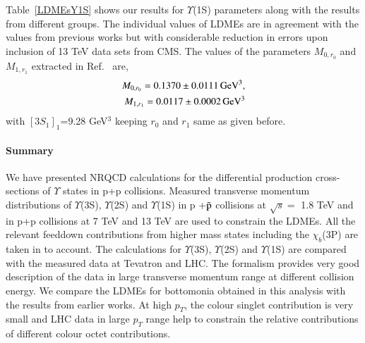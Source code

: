 Table~\ref{LDMEsY1S} shows our results for $\Upsilon$(1S) parameters along with
the results from different groups. The individual values of LDMEs are in agreement with
the values from previous works but with considerable reduction in 
errors upon inclusion of 13 TeV data sets from CMS.
The values of the parameters $M_{0,r_0}$ and $M_{1,r_1}$ extracted in Ref.~\cite{Han:2014kxa} are,
\begin{eqnarray}
  \nonumber
  M_{0,r_0}=0.1370\pm0.0111 \, {\rm GeV^3},\\ \nonumber
  M_{1,r_1}=0.0117\pm0.0002 \, {\rm GeV^3}
\end{eqnarray}
with $[3S_1]_1$=9.28 GeV$^3$ keeping $r_0$ and $r_1$ same as given before.

\paragraph{Summary}
\label{sec:summary}
We have presented NRQCD calculations for the differential production 
cross-sections of $\Upsilon$ states in  p+p collisions.  Measured transverse momentum
distributions of $\Upsilon$(3S), 
$\Upsilon$(2S) and $\Upsilon$(1S) in p +{$\bar {\rm p}$} collisions at $\sqrt{s}=$ 1.8 TeV and in 
p+p collisions at 7 TeV and 13 TeV are used to constrain the LDMEs. All the relevant feeddown
contributions from higher mass states including the $\chi_{b}$(3P) are taken in to account.
The calculations for  $\Upsilon$(3S), $\Upsilon$(2S) and $\Upsilon$(1S) are compared with 
the measured data at Tevatron and LHC. The formalism provides  very good description of the data in 
large transverse momentum range at different collision energy. 
We compare the LDMEs for bottomonia obtained in this analysis with the results from earlier works.
At high $p_T$, the colour singlet contribution is very small and LHC data in large $p_T$ range 
help to constrain the relative contributions of different colour octet contributions.
